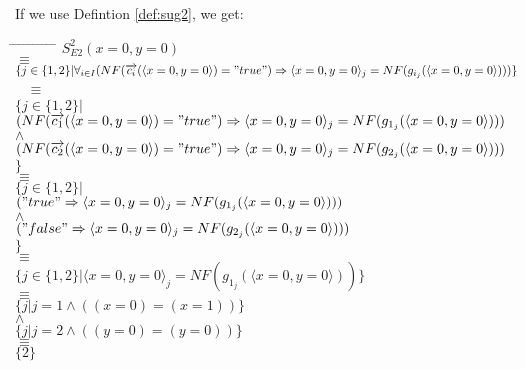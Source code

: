 \documentclass[a4paper,10pt]{article}
\newcommand{\ovr}{\overrightarrow}
\begin{document}
\begin{defn}
\begin{example} [Let $E2$ be]
\begin{verbatim}
\end{verbatim}
\end{example}
If we use Defintion \ref{def:sug2}, we get:
\begin{tabbing}
\hspace*{5.mm} \= \hspace*{5.mm} \= \hspace*{5.mm} \= \hspace*{5.mm} \= \hspace*{5.mm} \= \hspace*{5.mm}  \= \hspace*{5.mm}  \= \hspace*{5.mm}  \= \hspace*{5.mm} \= \hspace*{5.mm} \= \hspace*{5.mm}\kill
\> \> $S_{E2}^2(x =0, y=0)$\\
\> $\equiv$\\
\> \> $\lbrace j \in \lbrace 1, 2 \rbrace \vert \forall_{i\in I} (NF(\ovr{c_i}( \langle x = 0, y = 0\rangle ) = "true") \Rightarrow  \langle x = 0, y = 0\rangle_j = NF(g_{i_j}( \langle x = 0, y = 0\rangle)))\rbrace $\\\
\> $\equiv$ \\
\> \>$\lbrace j \in \lbrace 1, 2 \rbrace \vert $ \\
\> \> \> $(NF(\ovr{c_1}( \langle x = 0, y = 0\rangle ) = "true") \Rightarrow  \langle x = 0, y = 0\rangle_j = NF(g_{1_j}( \langle x = 0, y = 0\rangle))) $\\
\> \> \> $\wedge$ \\
\> \> \> $ (NF(\ovr{c_2}( \langle x = 0, y = 0\rangle ) = "true") \Rightarrow  \langle x = 0, y = 0\rangle_j = NF(g_{2_j}( \langle x = 0, y = 0\rangle))) $ \\
\> \>$
\rbrace $\\
\> $\equiv$ \\
\> \> $\lbrace j \in \lbrace 1, 2 \rbrace \vert $\\
\> \> \> $("true" \Rightarrow  \langle x = 0, y = 0\rangle_j = NF(g_{1_j}( \langle x = 0, y = 0\rangle)))$ \\
\> \> \> $\wedge$ \\
\> \> \> $("false" \Rightarrow  \langle x = 0, y = 0\rangle_j = NF(g_{2_j}( \langle x = 0, y = 0\rangle)))$ \\
\> \> $\rbrace $\\
\> $\equiv$ \\
\> \> $\lbrace j \in \lbrace 1, 2 \rbrace \vert 
\langle x = 0, y = 0\rangle_j = NF(g_{1_j}( \langle x = 0, y = 0\rangle))
\rbrace $\\
\> $\equiv$\\
\> \> $\lbrace j \vert j = 1 \wedge
((x = 0)  = (x = 1)) \rbrace $\\
\> \> $\wedge$ \\
\> \> $\lbrace j \vert j = 2 \wedge
((y = 0)  = (y = 0)) \rbrace $\\
\> $\equiv $ \\
\> \> $\lbrace 2 \rbrace$ \\
\end{tabbing}


\end{defn}
\end{document}
